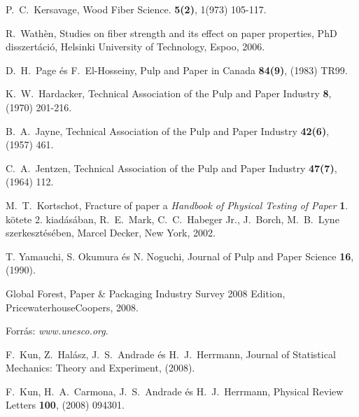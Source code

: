 \begin{thebibliography}{200}
\vspace*{-0.3cm}
 P.\ C.\ Kersavage, Wood Fiber Science. {\bf 5(2)}, 1(973) 105-117.

\vspace*{-0.3cm}
 R.\ Wath\`{e}n, Studies on fiber strength and its effect on paper properties, PhD disszert\'aci\'o, Helsinki University of Technology, Espoo, 2006.

\vspace*{-0.3cm}
 D.\ H.\ Page \'es F.\ El-Hosseiny, Pulp and Paper in Canada {\bf 84(9)}, (1983) TR99.

\vspace*{-0.3cm}
 K.\ W.\ Hardacker, Technical Association of the Pulp and Paper Industry {\bf 8}, (1970) 201-216.

\vspace*{-0.3cm}
 B.\ A.\ Jayne, Technical Association of the Pulp and Paper Industry {\bf 42(6)}, (1957) 461.

\vspace*{-0.3cm}
 C.\ A.\ Jentzen, Technical Association of the Pulp and Paper Industry {\bf 47(7)}, (1964) 112.

\vspace*{-0.3cm}
  M.\ T.\ Kortschot, Fracture of paper a {\it Handbook of Physical Testing of Paper} {\bf 1}. kötete 2. kiad\'as\'aban, R.\ E.\ Mark, C.\ C.\ Habeger Jr., J.\  Borch, M.\ B.\ Lyne szerkeszt\'es\'eben, Marcel Decker, New York, 2002.

\vspace*{-0.3cm}
 T. Yamauchi, S. Okumura \'es N. Noguchi, Journal of Pulp and Paper Science {\bf 16}, (1990).

\vspace*{-0.3cm}
 Global Forest, Paper \& Packaging Industry Survey 2008 Edition, PricewaterhouseCoopers, 2008. 

\vspace*{-0.3cm}
 Forr\'as: {\it www.unesco.org}.

\vspace*{-0.3cm}
 F.\ Kun, Z.\ Hal\'asz, J.\ S.\ Andrade \'es H.\ J.\ Herrmann, Journal of Statistical Mechanics: Theory and Experiment, (2008).

\vspace*{-0.3cm}
 F.\ Kun, H.\ A.\ Carmona, J.\ S.\ Andrade \'es H.\ J.\ Herrmann, Physical Review Letters {\bf 100}, (2008) 094301.


\end{thebibliography}
